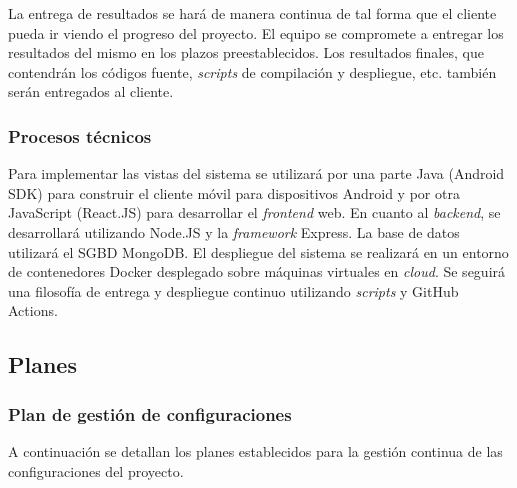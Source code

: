 \documentclass{article}
\begin{document}

La entrega de resultados se hará de manera continua de tal forma que el cliente pueda ir viendo el progreso del proyecto. El equipo se compromete a entregar los resultados del mismo en los plazos preestablecidos. Los resultados finales, que contendrán los códigos fuente, \textit{scripts} de compilación y despliegue, etc. también serán entregados al cliente.

\subsubsection{Procesos técnicos}
Para implementar las vistas del sistema se utilizará por una parte Java (Android SDK) para construir el cliente móvil para dispositivos Android y por otra JavaScript (React.JS) para desarrollar el \textit{frontend} web. En cuanto al \textit{backend}, se desarrollará utilizando Node.JS y la \textit{framework} Express. La base de datos utilizará el SGBD MongoDB. El despliegue del sistema se realizará en un entorno de contenedores Docker desplegado sobre máquinas virtuales en \textit{cloud}. Se seguirá una filosofía de entrega y despliegue continuo utilizando \textit{scripts} y GitHub Actions.

\subsection{Planes}

\subsubsection{Plan de gestión de configuraciones}
A continuación se detallan los planes establecidos para la gestión continua de las configuraciones del 
proyecto.
\end{document}
